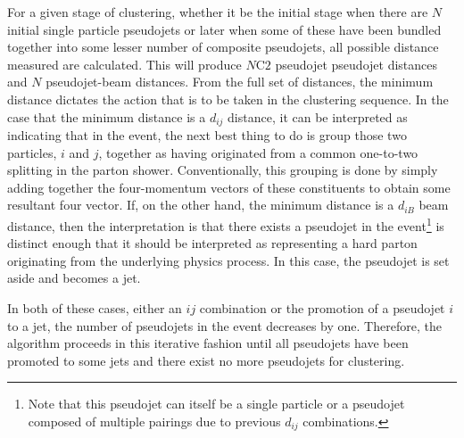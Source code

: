 \documentclass[UKenglish,texlive=2016]{\ATLASLATEXPATH atlasdoc}
\begin{document}
For a given stage of clustering, whether it be the initial stage when there are $N$ initial single particle pseudojets or later when some of these have been bundled together into some lesser number of composite pseudojets, all possible distance measured are calculated.  This will produce $N$C$2$ pseudojet pseudojet distances and $N$ pseudojet-beam distances.  From the full set of distances, the minimum distance dictates the action that is to be taken in the clustering sequence.  In the case that the minimum distance is a $d_{ij}$ distance, it can be interpreted as indicating that in the event, the next best thing to do is group those two particles, $i$ and $j$, together as having originated from a common one-to-two splitting in the parton shower.  Conventionally, this grouping is done by simply adding together the four-momentum vectors of these constituents to obtain some resultant four vector.  If, on the other hand, the minimum distance is a $d_{iB}$ beam distance, then the interpretation is that there exists a pseudojet in the event\footnote{Note that this pseudojet can itself be a single particle or a pseudojet composed of multiple pairings due to previous $d_{ij}$ combinations.} is distinct enough that it should be interpreted as representing a hard parton originating from the underlying physics process.  In this case, the pseudojet is set aside and becomes a jet.

In both of these cases, either an $ij$ combination or the promotion of a pseudojet $i$ to a jet, the number of pseudojets in the event decreases by one.  Therefore, the algorithm proceeds in this iterative fashion until all pseudojets have been promoted to some jets and there exist no more pseudojets for clustering.

\begin{center}
\end{center}
\end{document}
